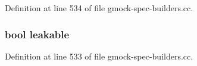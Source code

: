 Definition at line 534 of file gmock-\/spec-\/builders.\+cc.

\subsubsection[{\texorpdfstring{leakable}{leakable}}]{\setlength{\rightskip}{0pt plus 5cm}bool leakable}\hypertarget{gmock-spec-builders_8cc_a6ebc0cf6fc370a4da4a34648db39fd8b}{}\label{gmock-spec-builders_8cc_a6ebc0cf6fc370a4da4a34648db39fd8b}


Definition at line 533 of file gmock-\/spec-\/builders.\+cc.

